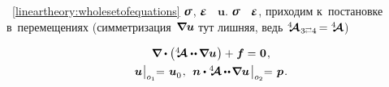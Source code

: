 \label{para:equationsfordisplacements.linearelasticity}

\begin{otherlanguage}{russian}

~\eqref{lineartheory:wholesetofequations}  $\linearstress$, $\infinitesimaldeformation$ ~$\bm{u}$.
 $\linearstress$ ~$\infinitesimaldeformation$, приходим к~постановке в~перемещениях
(симметризация~${\hspace{-0.2ex} \bm{\nabla}\hspace{-0.2ex} \bm{u}}$ тут лишняя, ведь ${\stiffnesstensor_{\hspace{.12ex} 3 \scalebox{0.6}[0.8]{$\rightleftarrows$} 4} \hspace{-0.25ex} = \stiffnesstensor}$)

\nopagebreak\vspace{-0.1em}\begin{equation}\label{lineartheory:equationsfordisplacements}
\begin{array}{c}
\boldnabla \dotp \left( \stiffnesstensor \dotdotp \hspace{-0.12ex} \boldnabla \bm{u} \hspace{.1ex} \right) + \hspace{.1ex} \bm{f} = \hspace{.1ex} \bm{0}
\hspace{.16ex} , \\[.4em]
%
\bm{u} \hspace{.1ex} \bigr|_{o_1} \hspace{-0.64ex} = \hspace{.2ex} \bm{u}_{\raisemath{-0.1em}{0}}
\hspace{.16ex} , \:\:
\unitnormalvector \dotp %
\stiffnesstensor \hspace{-0.08ex} \dotdotp \hspace{-0.24ex} \boldnabla \bm{u}
\hspace{.25ex} \bigr|_{o_2} \hspace{-0.64ex} = \hspace{.2ex} \bm{p}
\hspace{.16ex} .
\end{array}
\end{equation}%



\end{otherlanguage}
